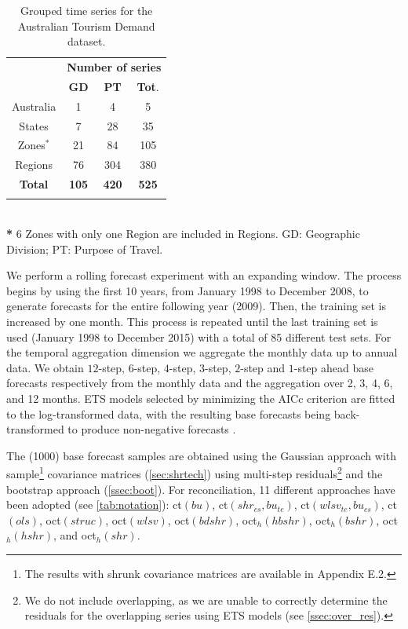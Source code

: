 \documentclass[12pt]{article}
\theoremstyle{definition}
\begin{document}
\begin{table}[!b]
	\setlength{\tabcolsep}{10pt}
	\centering
	\begin{tabular}{c|cc|c}
		\toprule
		& \multicolumn{3}{c}{\textbf{Number of series}}\\
		& \textbf{GD} & \textbf{PT} & \textbf{Tot}. \\
		\midrule
		Australia & 1 & 4 & 5 \\
		States & 7 & 28 & 35 \\
		Zones$^*$ & 21 & 84 & 105 \\
		Regions & 76 & 304 & 380 \\
		\bottomrule
		\textbf{Total} & \textbf{105}                                  & \textbf{420}   & \textbf{525} \\
		\bottomrule
		\addlinespace[0.3em]
	\end{tabular}\\
	{\footnotesize \textbf{*} 6 Zones with only one Region are included in Regions. GD: Geographic Division; PT: Purpose of Travel.}\\[0.1cm]
	\caption{\label{tab:nseries} Grouped time series for the Australian Tourism Demand dataset. }
	\vspace*{-0.5\baselineskip}
\end{table}

We perform a rolling forecast experiment with an expanding window. The process begins by using the first 10 years, from January 1998 to December 2008, to generate forecasts for the entire following year (2009). Then, the training set is increased by one month. This process is repeated until the last training set is used (January 1998 to December 2015) with a total of 85 different test sets. For the temporal aggregation dimension we aggregate the monthly data up to annual data. We obtain $12$-step, $6$-step, $4$-step, $3$-step, $2$-step and $1$-step ahead base forecasts respectively from the monthly data and the aggregation over 2, 3, 4, 6, and 12 months. ETS models selected by minimizing the AICc criterion \citep{Rforecast} %
are fitted to the log-transformed data, with the resulting base forecasts being back-transformed to produce non-negative forecasts \citep{wickramasuriya2020}.

The (1000) base forecast samples are obtained using the Gaussian approach with sample\footnote{The results with shrunk covariance matrices are available in Appendix E.2.} covariance matrices (\autoref{sec:shrtech}) using multi-step residuals\footnote{We do not include overlapping, as we are unable to correctly determine the residuals for the overlapping series using ETS models (see \autoref{ssec:over_res}).} and the bootstrap approach (\autoref{ssec:boot}). For reconciliation, 11 different approaches have been adopted (see \autoref{tab:notation}): ct$(bu)$, ct$(shr_{cs}, bu_{te})$, ct$(wlsv_{te}, bu_{cs})$, ct$(ols)$, oct$(struc)$, oct$(wlsv)$, oct$(bdshr)$, oct$_h(hbshr)$, oct$_h(bshr)$, oct$_h(hshr)$, and oct$_h(shr)$.
\end{document}
